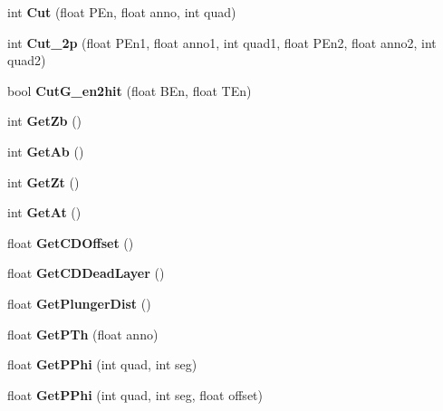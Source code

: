 \begin{DoxyCompactItemize}
int {\bfseries Cut} (float P\+En, float anno, int quad)
\item 
\mbox{\label{classdoppler_a52f116733da78465469a75ced66915a8}} 
int {\bfseries Cut\+\_\+2p} (float P\+En1, float anno1, int quad1, float P\+En2, float anno2, int quad2)
\item 
\mbox{\label{classdoppler_a56df9f9384f469385458193754c743c9}} 
bool {\bfseries Cut\+G\+\_\+en2hit} (float B\+En, float T\+En)
\item 
\mbox{\label{classdoppler_a29e9a1565d90df9f5d9deef05cdbf53c}} 
int {\bfseries Get\+Zb} ()
\item 
\mbox{\label{classdoppler_ac3cde63421ff794992231027245ceced}} 
int {\bfseries Get\+Ab} ()
\item 
\mbox{\label{classdoppler_ac0587ca2b963edec86d17dd6dac024ce}} 
int {\bfseries Get\+Zt} ()
\item 
\mbox{\label{classdoppler_a72bb0dc1707c0f2bf4b978caf06f2cf1}} 
int {\bfseries Get\+At} ()
\item 
\mbox{\label{classdoppler_ac7725720fab82af5a5a6f02041bc9483}} 
float {\bfseries Get\+C\+D\+Offset} ()
\item 
\mbox{\label{classdoppler_a2c1aef6db4ad3fc0c98e91d995992706}} 
float {\bfseries Get\+C\+D\+Dead\+Layer} ()
\item 
\mbox{\label{classdoppler_accc85c5ab5f322ec2c321f7653ccc40f}} 
float {\bfseries Get\+Plunger\+Dist} ()
\item 
\mbox{\label{classdoppler_a1415bdb47dbb9d5eba7f14a64bd3693e}} 
float {\bfseries Get\+P\+Th} (float anno)
\item 
\mbox{\label{classdoppler_a0f57a8f4a8c369c14d52e62dd3833f2e}} 
float {\bfseries Get\+P\+Phi} (int quad, int seg)
\item 
\mbox{\label{classdoppler_ac8f059cc77214a954be534a85c748a3c}} 
float {\bfseries Get\+P\+Phi} (int quad, int seg, float offset)

\end{DoxyCompactItemize}
